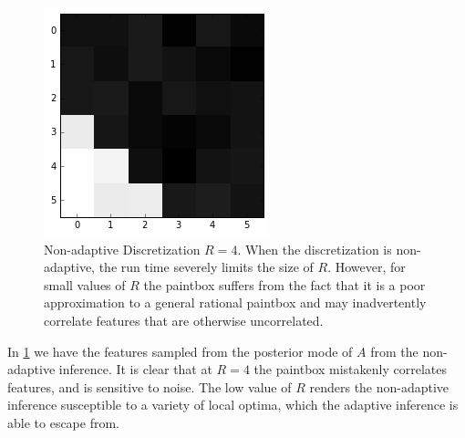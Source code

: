 \documentclass{article}
\begin{document}
\begin{figure}[ht]
\begin{center}
\includegraphics[scale=0.3]{b5}
\caption{Non-adaptive Discretization $R = 4$.  When the discretization is non-adaptive, the run time severely limits the size of $R$.  However, for small values of $R$ the paintbox suffers from the fact that it is a poor approximation to a general rational paintbox and may inadvertently correlate features that are otherwise uncorrelated.}
\label{feature4}
\end{center}
\vskip -0.2in
\end{figure}
In \ref{feature4} we have the features sampled from the posterior mode of $A$ from the non-adaptive inference.  It is clear that at $R=4$ the paintbox mistakenly correlates features, and is sensitive to noise.  The low value of $R$ renders the non-adaptive inference susceptible to a variety of local optima, which the adaptive inference is able to escape from.       
\end{document}
